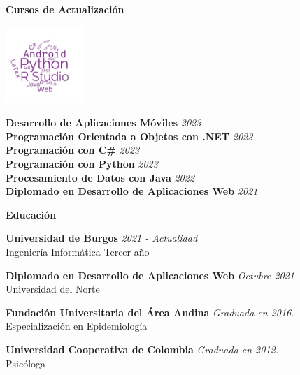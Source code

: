 \documentclass{resume} %
\begin{document}
\begin{rSection}{\textbf{\Large Cursos de Actualización}}
\begin{minipage}{0.3\textwidth}
    \includegraphics[width=110px]{wordcloud4.jpg}
\end{minipage}%
\begin{minipage}{0.7\textwidth}
    \textbf{Desarrollo de Aplicaciones Móviles} \emph{2023} \\
    \textbf{Programación Orientada a Objetos con .NET}  \emph{2023} \\
    \textbf{Programación con C\#} \emph{2023} \\
    \textbf{Programación con Python} \emph{2023} \\
    \textbf{Procesamiento de Datos con Java}  \emph{2022} \\
    \textbf{Diplomado en Desarrollo de Aplicaciones Web} \emph{2021}
\end{minipage}
\end{rSection}


\begin{rSection}{\textbf{\Large Educación}}

{\bf  Universidad de Burgos} \hfill {\em 2021 - Actualidad} 
\\ Ingeniería Informática \hfill { Tercer año}


{\bf Diplomado en Desarrollo de Aplicaciones Web} \hfill {\em Octubre 2021} 
\\ Universidad del Norte  \hfill { }

{\bf  Fundación Universitaria del Área Andina} \hfill {\em Graduada en 2016.} 
\\ Especialización en Epidemiología \hfill {}

{\bf   Universidad Cooperativa de Colombia} \hfill {\em Graduada en 2012.} 
\\ Psicóloga \hfill {}


\end{rSection}
\end{document}
